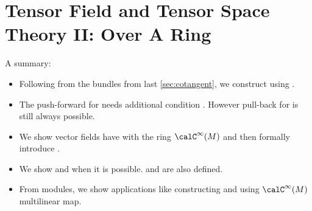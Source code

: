 \documentclass{article}
\begin{document}
\section{Tensor Field and Tensor Space Theory II: Over A Ring}\label{sec:tensorII}

A summary:
\begin{itemize}[$\blacktriangleright$]
\item Following from the bundles from last \cref{sec:cotangent}, we construct  using .
\item The  push-forward for   needs additional condition  . However  pull-back for  is  still always possible.
\item We show vector fields have  with the ring $\calC^\infty(M)$ and then formally introduce . 
\item We show  and when it is possible.  and  are also defined.
\item From modules, we show applications like constructing  and  using $\calC^\infty(M)$ multilinear map.
\end{itemize}
\end{document}
